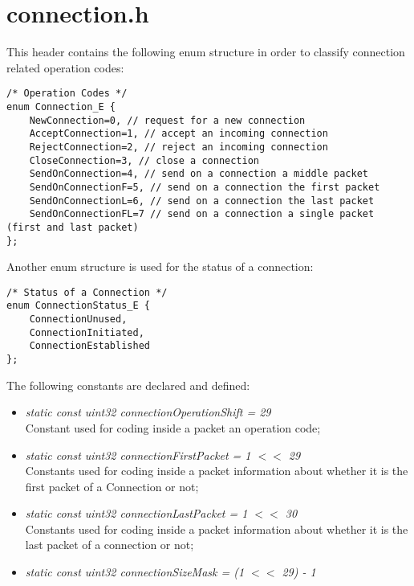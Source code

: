 

\section{connection.h}

This header contains the following enum structure in order to classify connection related operation codes:

\begin{lstlisting}
/* Operation Codes */
enum Connection_E {
    NewConnection=0, // request for a new connection
    AcceptConnection=1, // accept an incoming connection
    RejectConnection=2, // reject an incoming connection
    CloseConnection=3, // close a connection 
    SendOnConnection=4, // send on a connection a middle packet
    SendOnConnectionF=5, // send on a connection the first packet
    SendOnConnectionL=6, // send on a connection the last packet
    SendOnConnectionFL=7 // send on a connection a single packet (first and last packet)
};
\end{lstlisting}

Another enum structure is used for the status of a connection:

\begin{lstlisting}
/* Status of a Connection */
enum ConnectionStatus_E {
    ConnectionUnused,
    ConnectionInitiated,
    ConnectionEstablished
};
\end{lstlisting}

The following constants are declared and defined:

\begin{itemize}
	
	\item \emph{static const uint32 connectionOperationShift = 29}
	\\Constant used for coding inside a packet an operation code;
	
	\item \emph{static const uint32 connectionFirstPacket = 1 $<<$ 29}
	\\Constants used for coding inside a packet information about whether it is the first packet of a Connection or not;
	
	\item \emph{static const uint32 connectionLastPacket = 1 $<<$ 30}
	\\Constants used for coding inside a packet information about whether it is the last packet of a connection or not;
	
	\item \emph{static const uint32 connectionSizeMask = (1 $<<$ 29) - 1}
	
\end{itemize}

